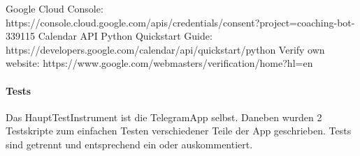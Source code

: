     Google Cloud Console: https://console.cloud.google.com/apis/credentials/consent?project=coaching-bot-339115 
    Calendar API Python Quickstart Guide: https://developers.google.com/calendar/api/quickstart/python 
    Verify own website: https://www.google.com/webmasters/verification/home?hl=en
    
    
    \paragraph{Tests}
    Das Haupt\-Test\-Instrument ist die Telegram\-App selbst. Daneben wurden 2 Testskripte zum einfachen Testen verschiedener Teile der App geschrieben. Tests sind getrennt und entsprechend ein\- oder auskommentiert. 